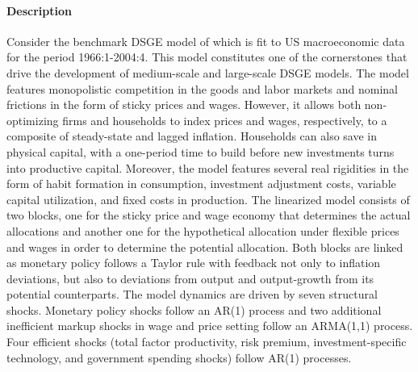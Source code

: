 \documentclass{article}
\begin{document}
\paragraph{Description}
Consider the benchmark DSGE model of \textcite{Smets.Wouters_2007_ShocksFrictionsUS} which is fit to US macroeconomic data for the period 1966:1-2004:4. This model constitutes one of the cornerstones that drive the development of medium-scale and large-scale DSGE models. The model features monopolistic competition in the goods and labor markets and nominal frictions in the form of sticky prices and wages. However, it allows both non-optimizing firms and households to index prices and wages, respectively, to a composite of steady-state and lagged inflation. Households can also save in physical capital, with a one-period time to build before new investments turns into productive capital. Moreover, the model features several real rigidities in the form of habit formation in consumption, investment adjustment costs, variable capital utilization, and fixed costs in production. The linearized model consists of two blocks, one for the sticky price and wage economy that determines the actual allocations and another one for the hypothetical allocation under flexible prices and wages in order to determine the potential allocation. Both blocks are linked as monetary policy follows a Taylor rule with feedback not only to inflation deviations, but also to deviations from output and output-growth from its potential counterparts. The model dynamics are driven by seven structural shocks. Monetary policy shocks follow an AR(1) process and two additional inefficient markup shocks in wage and price setting follow an ARMA(1,1) process. Four efficient shocks (total factor productivity, risk premium, investment-specific technology, and government spending shocks) follow AR(1) processes.
\end{document}
